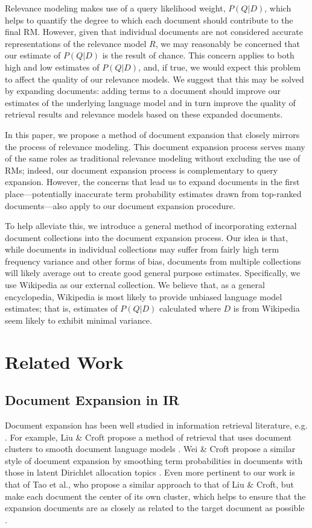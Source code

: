 \documentclass{article}
\begin{document}
Relevance modeling makes use of a query likelihood weight, $P(Q|D)$, which helps to quantify the degree to which each document should contribute to the final RM. However, given that individual documents are not considered accurate representations of the relevance model $R$, we may reasonably be concerned that our estimate of $P(Q|D)$ is the result of chance. This concern applies to both high and low estimates of $P(Q|D)$, and, if true, we would expect this problem to affect the quality of our relevance models. We suggest that this may be solved by expanding documents: adding terms to a document should improve our estimates of the underlying language model and in turn improve the quality of retrieval results and relevance models based on these expanded documents.

In this paper, we propose a method of document expansion that closely mirrors the process of relevance modeling. This document expansion process serves many of the same roles as traditional relevance modeling without excluding the use of RMs; indeed, our document expansion process is complementary to query expansion. However, the concerns that lead us to expand documents in the first place---potentially inaccurate term probability estimates drawn from top-ranked documents---also apply to our document expansion procedure.

To help alleviate this, we introduce a general method of incorporating external document collections into the document expansion process. Our idea is that, while documents in individual collections may suffer from fairly high term frequency variance and other forms of bias, documents from multiple collections will likely average out to create good general purpose estimates. Specifically, we use Wikipedia as our external collection. We believe that, as a general encyclopedia, Wikipedia is most likely to provide unbiased language model estimates; that is, estimates of $P(Q|D)$ calculated where $D$ is from Wikipedia seem likely to exhibit minimal variance.

\section{Related Work}\label{section.related}

\subsection{Document Expansion in IR}\label{section.related.ir}

Document expansion has been well studied in information retrieval literature, e.g. \cite{Liu2004, Tao2006, Hubert2009, Singhal1999}. For example, Liu \& Croft propose a method of retrieval that uses document clusters to smooth document language models \cite{Liu2004}. Wei \& Croft propose a similar style of document expansion by smoothing term probabilities in documents with those in latent Dirichlet allocation topics \cite{Wei2006}. Even more pertinent to our work is that of Tao et al., who propose a similar approach to that of Liu \& Croft, but make each document the center of its own cluster, which helps to ensure that the expansion documents are as closely as related to the target document as possible \cite{Tao2006}.
\end{document}

